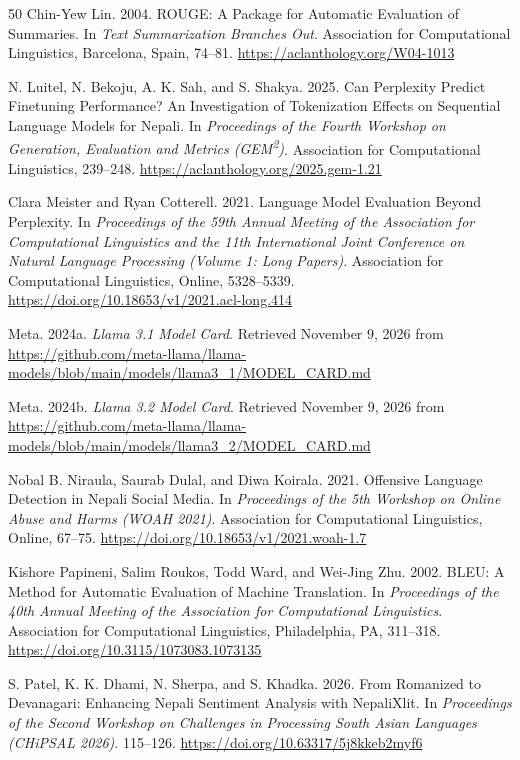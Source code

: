 \documentclass{article}
\begin{document}
\begin{thebibliography}{50}
Chin-Yew Lin. 2004. ROUGE: A Package for Automatic Evaluation of Summaries. In \emph{Text Summarization Branches Out}. Association for Computational Linguistics, Barcelona, Spain, 74–81. \url{https://aclanthology.org/W04-1013}

N. Luitel, N. Bekoju, A. K. Sah, and S. Shakya. 2025. Can Perplexity Predict Finetuning Performance? An Investigation of Tokenization Effects on Sequential Language Models for Nepali. In \emph{Proceedings of the Fourth Workshop on Generation, Evaluation and Metrics (GEM\textsuperscript{2})}. Association for Computational Linguistics, 239–248. \url{https://aclanthology.org/2025.gem-1.21}

Clara Meister and Ryan Cotterell. 2021. Language Model Evaluation Beyond Perplexity. In \emph{Proceedings of the 59th Annual Meeting of the Association for Computational Linguistics and the 11th International Joint Conference on Natural Language Processing (Volume 1: Long Papers)}. Association for Computational Linguistics, Online, 5328–5339. \url{https://doi.org/10.18653/v1/2021.acl-long.414}

Meta. 2024a. \emph{Llama 3.1 Model Card}. Retrieved November 9, 2026 from \url{https://github.com/meta-llama/llama-models/blob/main/models/llama3_1/MODEL_CARD.md}

Meta. 2024b. \emph{Llama 3.2 Model Card}. Retrieved November 9, 2026 from \url{https://github.com/meta-llama/llama-models/blob/main/models/llama3_2/MODEL_CARD.md}

Nobal B. Niraula, Saurab Dulal, and Diwa Koirala. 2021. Offensive Language Detection in Nepali Social Media. In \emph{Proceedings of the 5th Workshop on Online Abuse and Harms (WOAH 2021)}. Association for Computational Linguistics, Online, 67–75. \url{https://doi.org/10.18653/v1/2021.woah-1.7}

Kishore Papineni, Salim Roukos, Todd Ward, and Wei-Jing Zhu. 2002. BLEU: A Method for Automatic Evaluation of Machine Translation. In \emph{Proceedings of the 40th Annual Meeting of the Association for Computational Linguistics}. Association for Computational Linguistics, Philadelphia, PA, 311–318. \url{https://doi.org/10.3115/1073083.1073135}

S. Patel, K. K. Dhami, N. Sherpa, and S. Khadka. 2026. From Romanized to Devanagari: Enhancing Nepali Sentiment Analysis with NepaliXlit. In \emph{Proceedings of the Second Workshop on Challenges in Processing South Asian Languages (CHiPSAL 2026)}. 115–126. \url{https://doi.org/10.63317/5j8kkeb2myf6}


\end{thebibliography}
\end{document}
